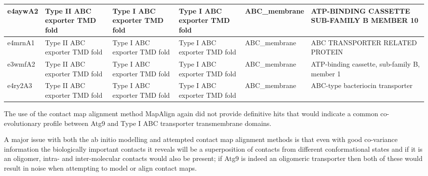\begin{table}
{\begin{tabular}{!{\color{white}\vrule}l!{\color{black}\vrule}l!{\color{white}\vrule}l!{\color{white}\vrule}l!{\color{white}\vrule}l!{\color{white}\vrule}l!{\color{white}\vrule}}
\hline
{} e4aywA2                                                                    & Type II ABC exporter TMD fold          & Type I ABC exporter TMD fold           & Type I ABC exporter TMD fold           & ABC\_membrane                                           & ATP-BINDING CASSETTE SUB-FAMILY B MEMBER 10                            \\ 
\hline
{} e4mrnA1                                                                    & Type II ABC exporter TMD fold          & Type I ABC exporter TMD fold           & Type I ABC exporter TMD fold           & ABC\_membrane                                           & ABC TRANSPORTER RELATED PROTEIN                                        \\ 
\hline
{} e3wmfA2                                                                    & Type II ABC exporter TMD fold          & Type I ABC exporter TMD fold           & Type I ABC exporter TMD fold           & ABC\_membrane                                           & ATP-binding cassette, sub-family B, member 1                           \\ 
\hline
{} e4ry2A3                                                                    & Type II ABC exporter TMD fold          & Type I ABC exporter TMD fold           & Type I ABC exporter TMD fold           & ABC\_membrane                                           & ABC-type bacteriocin transporter                                       \\
\hline
\end{tabular}
}
\label{table:map_align_eco}
\end{table}

The use of the contact map alignment method MapAlign again did not provide definitive hits that would indicate a common co-evolutionary profile between Atg9 and Type I ABC transporter transmembrane domains. 

A major issue with both the ab initio modelling and attempted contact map alignment methods is that even with good co-variance information the biologically
important contacts it reveals will be a superposition of contacts from different conformational states and if it is an oligomer, intra- and inter-molecular contacts would also be present; if Atg9 is indeed an oligomeric transporter then both of these would result in noise when attempting to model or align contact maps.


